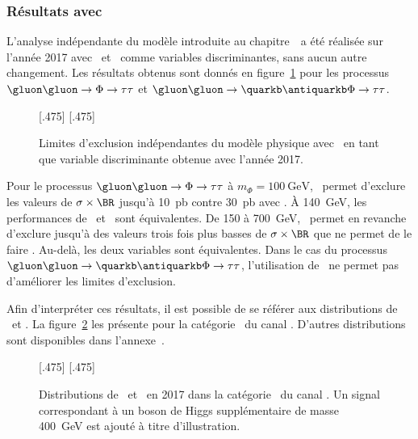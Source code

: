 \subsubsection{Résultats avec \mml}
L'analyse indépendante du modèle introduite au chapitre~\ a été réalisée
sur l'année 2017
avec \mml\ et \mTtot\ comme variables discriminantes,
sans aucun autre changement.
Les résultats obtenus sont donnés en figure~\ref{fig-model_indep_2017_mml}
pour les processus $\gluon\gluon\to\Phi\to\tau\tau$ et $\gluon\gluon\to\quarkb\antiquarkb\Phi\to\tau\tau$.
\begin{figure}[h]
\centering

[.475\textwidth]
{}
\hfill
{}[.475\textwidth]
{}


\caption{Limites d'exclusion indépendantes du modèle physique avec \mml\ en tant que variable discriminante obtenue avec l'année 2017.}
\label{fig-model_indep_2017_mml}
\end{figure}
\par
Pour le processus $\gluon\gluon\to\Phi\to\tau\tau$
à $m_\Phi=\SI{100}{\GeV}$,
\mml\ permet d'exclure les valeurs de $\sigma\times\BR$ jusqu'à \SI{10}{\pico\barn}
contre \SI{30}{\pico\barn} avec \mTtot.
À \SI{140}{\GeV}, les performances de \mml\ et \mTtot\ sont équivalentes.
De \num{150} à \SI{700}{\GeV}, \mTtot\ permet en revanche d'exclure jusqu'à des valeurs trois fois plus basses de $\sigma\times\BR$ que ne permet de le faire \mml.
Au-delà, les deux variables sont équivalentes.
Dans le cas du processus $\gluon\gluon\to\quarkb\antiquarkb\Phi\to\tau\tau$,
l'utilisation de \mml\ ne permet pas d'améliorer les limites d'exclusion.
\par
Afin d'interpréter ces résultats, il est possible de se référer aux distributions de \mml\ et \mTtot.
La figure~\ref{fig-distributions_mml_mttot_2017_tt_btag} les présente pour la catégorie \CATbtag\ du canal \tauh\tauh.
D'autres distributions sont disponibles dans l'annexe~.
\begin{figure}[h]
\centering

[.475\textwidth]
{}
\hfill
{}[.475\textwidth]
{}

\caption[Distributions de \mTtot\ et \mml\ en 2017 dans la catégorie \CATbtag\ du canal \tauh\tauh.]{Distributions de \mTtot\ et \mml\ en 2017 dans la catégorie \CATbtag\ du canal \tauh\tauh. Un signal correspondant à un boson de Higgs supplémentaire de masse \SI{400}{\GeV} est ajouté à titre d'illustration.}
\label{fig-distributions_mml_mttot_2017_tt_btag}
\end{figure}

